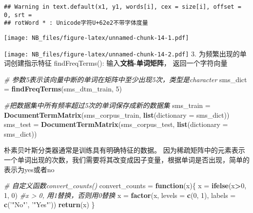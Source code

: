 \documentclass[]{article}
\newenvironment{Shaded}{\begin{snugshade}}{\end{snugshade}}
\newcommand{\KeywordTok}[1]{\textcolor[rgb]{0.13,0.29,0.53}{\textbf{#1}}}
\newcommand{\DataTypeTok}[1]{\textcolor[rgb]{0.13,0.29,0.53}{#1}}
\newcommand{\DecValTok}[1]{\textcolor[rgb]{0.00,0.00,0.81}{#1}}
\newcommand{\FloatTok}[1]{\textcolor[rgb]{0.00,0.00,0.81}{#1}}
\newcommand{\StringTok}[1]{\textcolor[rgb]{0.31,0.60,0.02}{#1}}
\newcommand{\CommentTok}[1]{\textcolor[rgb]{0.56,0.35,0.01}{\textit{#1}}}
\newcommand{\ControlFlowTok}[1]{\textcolor[rgb]{0.13,0.29,0.53}{\textbf{#1}}}
\newcommand{\OperatorTok}[1]{\textcolor[rgb]{0.81,0.36,0.00}{\textbf{#1}}}
\newcommand{\NormalTok}[1]{#1}
\begin{document}
\begin{verbatim}
## Warning in text.default(x1, y1, words[i], cex = size[i], offset = 0, srt =
## rotWord * : Unicode字符U+62e2不带字体度量
\end{verbatim}

\texttt{[image: NB\_files/figure-latex/unnamed-chunk-14-1.pdf]}

\begin{Shaded}
\end{Shaded}

\texttt{[image: NB\_files/figure-latex/unnamed-chunk-14-2.pdf]} 3.
为频繁出现的单词创建指示特征 findFreqTerms():
输入\textbf{文档-单词矩阵}， 返回一个字符向量

\begin{Shaded}
\begin{Highlighting}[]
\CommentTok{# 参数5表示该向量中断的单词在矩阵中至少出现5次，类型是character}
\NormalTok{sms_dict =}\StringTok{ }\KeywordTok{findFreqTerms}\NormalTok{(sms_dtm_train, }\DecValTok{5}\NormalTok{)}

\CommentTok{#把数据集中所有频率超过5次的单词保存成新的数据集}
\NormalTok{sms_train =}\StringTok{ }\KeywordTok{DocumentTermMatrix}\NormalTok{(sms_corpus_train, }\KeywordTok{list}\NormalTok{(}\DataTypeTok{dictionary =}\NormalTok{ sms_dict))}
\NormalTok{sms_test =}\StringTok{ }\KeywordTok{DocumentTermMatrix}\NormalTok{(sms_corpus_test, }\KeywordTok{list}\NormalTok{(}\DataTypeTok{dictionary =}\NormalTok{ sms_dict))}
\end{Highlighting}
\end{Shaded}

朴素贝叶斯分类器通常是训练具有明确特征的数据。
因为稀疏矩阵中的元素表示一个单词出现的次数，我们需要将其改变成因子变量，根据单词是否出现，简单的表示为yes或者no

\begin{Shaded}
\begin{Highlighting}[]
\CommentTok{# 自定义函数convert_counts()}
\NormalTok{convert_counts =}\StringTok{ }\ControlFlowTok{function}\NormalTok{(x)\{ }
\NormalTok{  x =}\StringTok{ }\KeywordTok{ifelse}\NormalTok{(x}\OperatorTok{>}\DecValTok{0}\NormalTok{, }\DecValTok{1}\NormalTok{, }\DecValTok{0}\NormalTok{)  }\CommentTok{#x > 0, 用1替换，否则用0替换}
\NormalTok{  x =}\StringTok{ }\KeywordTok{factor}\NormalTok{(x, }\DataTypeTok{levels =} \KeywordTok{c}\NormalTok{(}\DecValTok{0}\NormalTok{, }\DecValTok{1}\NormalTok{), }\DataTypeTok{labels =} \KeywordTok{c}\NormalTok{(}\StringTok{'"No"'}\NormalTok{, }\StringTok{'"Yes"'}\NormalTok{))}
  \KeywordTok{return}\NormalTok{(x)}
\NormalTok{  \}}
\end{Highlighting}
\end{Shaded}
\end{document}
